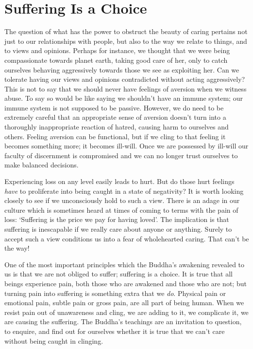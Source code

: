 \section{Suffering Is a Choice}

The question of what has the power to obstruct the beauty of caring
pertains not just to our relationships with people, but also to the way
we relate to things, and to views and opinions. Perhaps for instance, we
thought that we were being compassionate towards planet earth, taking
good care of her, only to catch ourselves behaving aggressively towards
those we see as exploiting her. Can we tolerate having our views and
opinions contradicted without acting aggressively? This is not to say
that we should never have feelings of aversion when we witness abuse. To
say so would be like saying we shouldn’t have an immune system; our
immune system is not supposed to be passive. However, we do need to be
extremely careful that an appropriate sense of aversion doesn’t turn
into a thoroughly inappropriate reaction of hatred, causing harm to
ourselves and others. Feeling aversion can be functional, but if we
cling to that feeling it becomes something more; it becomes ill-will.
Once we are possessed by ill-will our faculty of discernment is
compromised and we can no longer trust ourselves to make balanced
decisions.

Experiencing loss on any level easily leads to hurt. But do those hurt
feelings \emph{have} to proliferate into being caught in a state of
negativity? It is worth looking closely to see if we unconsciously hold
to such a view. There is an adage in our culture which is sometimes
heard at times of coming to terms with the pain of loss: ‘Suffering is
the price we pay for having loved’. The implication is that suffering is
inescapable if we really care about anyone or anything. Surely to accept
such a view conditions us into a fear of wholehearted caring. That can’t
be the way!

One of the most important principles which the Buddha’s awakening
revealed to us is that we are not obliged to suffer; suffering is a
choice. It is true that all beings experience pain, both those who are
awakened and those who are not; but turning pain into suffering is
something extra that we \emph{do}. Physical pain or emotional pain, subtle
pain or gross pain, are all part of being human. When we resist pain out
of unawareness and cling, we are adding to it, we complicate it, we are
causing the suffering. The Buddha’s teachings are an invitation to
question, to enquire, and find out for ourselves whether it is true that
we can’t care without being caught in clinging.

